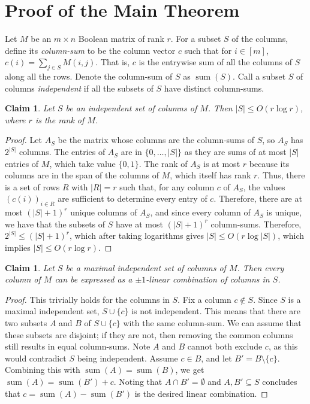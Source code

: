 \documentclass[11pt]{article}
\theoremstyle{plain}
\newtheorem{claim}[thm]{Claim}
\theoremstyle{remark}
\DeclareMathOperator{\sumc}{sum}
\begin{document}
\section{Proof of the Main Theorem} \label{sec:main-theorem}
Let $M$ be an $m \times n$ Boolean matrix of rank $r$.
For a subset $S$ of the columns, define its \emph{column-sum} to be the column vector $c$ such that for $i \in [m]$, $c(i) = \sum_{j \in S} M(i, j)$. 
That is, $c$ is the entrywise sum of all the columns of $S$ along all the rows. Denote the column-sum of $S$ as $\sumc(S)$. Call a subset $S$ of columns \emph{independent} if all the subsets of $S$ have distinct column-sums.

\begin{claim} \label{cl:IS-size}
	Let $S$ be an independent set of columns of $M$. Then $|S| \leq O(r \log r)$, where $r$ is the rank of $M$.
\end{claim}
\begin{proof}
	Let $A_S$ be the matrix whose columns are the column-sums of $S$, so $A_{S}$ has $2^{|S|}$ columns. The entries of $A_S$ are in $\{0,\ldots,|S|\}$ as they are sums of at most $|S|$ entries of $M$, which take value $\{0, 1\}$. The rank of $A_S$ is at most $r$ because its columns are in the span of the columns of $M$, which itself has rank $r$. Thus, there is a set of rows $R$ with $|R| = r$ such that, for any column $c$ of $A_S$, the values $(c(i))_{i \in R}$ are sufficient to determine every entry of $c$. Therefore, there are at most $(|S|+1)^r$  unique columns of $A_S$, and since every column of $A_S$ is unique, we have that the subsets of $S$ have at most $(|S|+1)^r$ column-sums.  Therefore, $2^{|S|} \leq (|S|+1)^r$, which after taking logarithms gives $|S| \leq O(r \log |S|)$, which implies $|S| \leq O(r \log r)$.
\end{proof}

\begin{claim}\label{cl:linear_combin}
	Let $S$ be a maximal independent set of columns of $M$.  Then every column of $M$ can be expressed as a  $\pm 1$-linear combination of columns in $S$.
\end{claim}

\begin{proof}
	This trivially holds for the columns in $S$. 
	Fix a column $c \notin S$. Since $S$ is a maximal independent set, $S \cup \{c\}$ is not independent. This means that there are two subsets $A$ and $B$ of $S \cup \{c\}$ with the same column-sum. We can assume that these subsets are disjoint; if they are not, then removing the common columns still results in equal column-sums. Note $A$ and $B$ cannot both exclude $c$, as this would contradict $S$ being independent. Assume $c \in B$, and let $B' = B\setminus \{c\}$. Combining this with $\sumc(A)=\sumc(B)$, we get $\sumc(A) = \sumc(B') + c$. Noting that $A \cap B' = \emptyset$ and $A,B' \subseteq S$ concludes that $c=\sumc(A)-\sumc(B')$ is the desired linear combination.
\end{proof}
\end{document}
